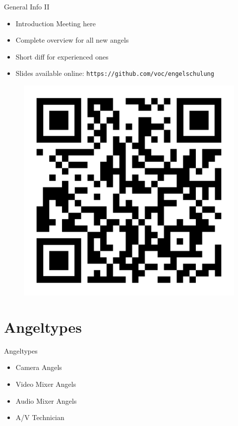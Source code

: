\documentclass[aspectratio=169]{beamer}
\begin{document}
\begin{frame}{General Info II}
	\begin{itemize}
		\item Introduction Meeting here
		\item Complete overview for all new angels
		\item Short diff for experienced ones
		\item Slides available online: \texttt{https://github.com/voc/engelschulung}
	\end{itemize}
	\begin{figure} 
		\centering
		\includegraphics[height=0.4\textheight]{images/qr-code.png}
	\end{figure}
\end{frame}

\section{Angeltypes}
\begin{frame}{Angeltypes}
	\begin{itemize}
		\item Camera Angels
		\item Video Mixer Angels
        \item Audio Mixer Angels
		\item A/V Technician
	\end{itemize}
\end{frame}
\end{document}

